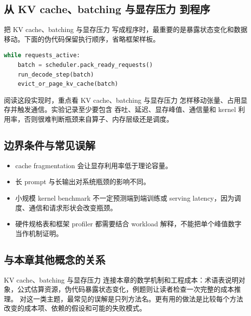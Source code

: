 \documentclass[a4paper]{article}
\begin{document}
\subsection{从 KV cache、batching 与显存压力 到程序}
把 KV cache、batching 与显存压力 写成程序时，最重要的是暴露状态变化和数据移动。下面的伪代码保留执行顺序，省略框架样板。
\begin{lstlisting}[language=Python]
while requests_active:
    batch = scheduler.pack_ready_requests()
    run_decode_step(batch)
    evict_or_page_kv_cache(batch)
\end{lstlisting}
阅读这段实现时，重点看 KV cache、batching 与显存压力 怎样移动张量、占用显存并触发通信。实验记录至少要包含 吞吐、延迟、显存峰值、通信量和 kernel 利用率，否则很难判断瓶颈来自算子、内存层级还是调度。
\subsection{边界条件与常见误解}
\begin{itemize}
\item cache fragmentation 会让显存利用率低于理论容量。
\item 长 prompt 与长输出对系统瓶颈的影响不同。
\item 小规模 kernel benchmark 不一定预测端到端训练或 serving latency，因为调度、通信和请求形状会改变瓶颈。
\item 硬件规格表和框架 profiler 都需要结合 workload 解释，不能把单个峰值数字当作机制证明。
\end{itemize}
\subsection{与本章其他概念的关系}
KV cache、batching 与显存压力 连接本章的数学机制和工程成本：术语表说明对象，公式估算资源，伪代码暴露状态变化，例题则让读者检查一次完整的成本推理。
对这一类主题，最常见的误解是只列方法名。更有用的做法是比较每个方法改变的成本项、依赖的假设和可能的失败模式。
\end{document}
